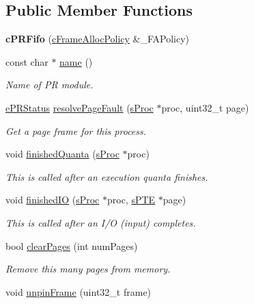 \subsection*{\-Public \-Member \-Functions}
\begin{DoxyCompactItemize}
\item 
\hypertarget{classcPRFifo_a87ea4d98314c4418060e57982414a39f}{{\bfseries c\-P\-R\-Fifo} (\hyperlink{classcFrameAllocPolicy}{c\-Frame\-Alloc\-Policy} \&\-\_\-\-F\-A\-Policy)}\label{db/d3a/classcPRFifo_a87ea4d98314c4418060e57982414a39f}

\item 
const char $\ast$ \hyperlink{classcPRFifo_aa3b9269589ccebd364d07ef69015bad6}{name} ()
\begin{DoxyCompactList}\small\item\em \-Name of \-P\-R module. \end{DoxyCompactList}\item 
\hyperlink{pageReplace_8h_af4bc4c41a44c2bd80e8cbf1aae370217}{e\-P\-R\-Status} \hyperlink{classcPRFifo_a8121128a2dac3c8194c044e81fa0e5fc}{resolve\-Page\-Fault} (\hyperlink{structsProc}{s\-Proc} $\ast$proc, uint32\-\_\-t page)
\begin{DoxyCompactList}\small\item\em \-Get a page frame for this process. \end{DoxyCompactList}\item 
void \hyperlink{classcPRFifo_aadb8319e6e539280e0f56c0e6b40c581}{finished\-Quanta} (\hyperlink{structsProc}{s\-Proc} $\ast$proc)
\begin{DoxyCompactList}\small\item\em \-This is called after an execution quanta finishes. \end{DoxyCompactList}\item 
void \hyperlink{classcPRFifo_a158824c0cf38fa23a14f7148431bc34d}{finished\-I\-O} (\hyperlink{structsProc}{s\-Proc} $\ast$proc, \hyperlink{structsPTE}{s\-P\-T\-E} $\ast$page)
\begin{DoxyCompactList}\small\item\em \-This is called after an \-I/\-O (input) completes. \end{DoxyCompactList}\item 
bool \hyperlink{classcPRFifo_ab2bca492cfd0a628df492781ecd726ff}{clear\-Pages} (int num\-Pages)
\begin{DoxyCompactList}\small\item\em \-Remove this many pages from memory. \end{DoxyCompactList}\item 
\hypertarget{classcPRFifo_ac2bfc42038801005f9dbfed30d583bca}{void \hyperlink{classcPRFifo_ac2bfc42038801005f9dbfed30d583bca}{unpin\-Frame} (uint32\-\_\-t frame)}\label{db/d3a/classcPRFifo_ac2bfc42038801005f9dbfed30d583bca}


\end{DoxyCompactItemize}
